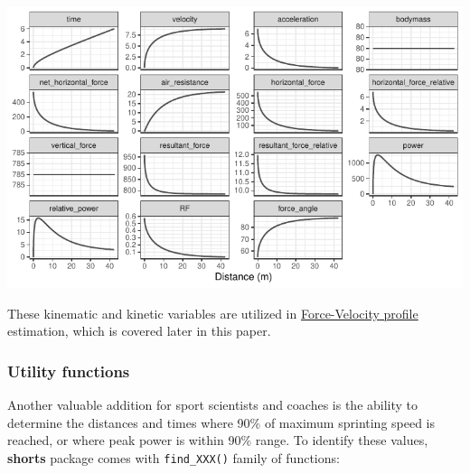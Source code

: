 \documentclass[fleqn,10pt,lineno]{wlpeerj} %
\begin{document}
\begin{center}\includegraphics[width=0.9\linewidth]{paper_files/figure-latex/unnamed-chunk-7-1} \end{center}

These kinematic and kinetic variables are utilized in \protect\hyperlink{force-velocity-profile}{Force-Velocity profile} estimation, which is covered later in this paper.

\hypertarget{utility-functions}{%
\subsubsection{Utility functions}\label{utility-functions}}

Another valuable addition for sport scientists and coaches is the ability to determine the distances and times where 90\% of maximum sprinting speed is reached, or where peak power is within 90\% range. To identify these values, \textbf{shorts} package comes with \texttt{find\_XXX()} family of functions:
\end{document}
